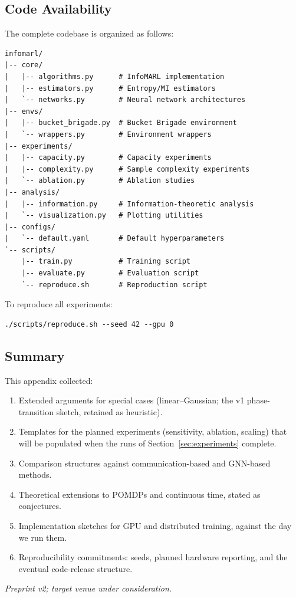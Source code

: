 \documentclass[10pt, letterpaper]{article}
\begin{document}
\subsection{Code Availability}

The complete codebase is organized as follows:

\begin{verbatim}
infomarl/
|-- core/
|   |-- algorithms.py      # InfoMARL implementation
|   |-- estimators.py      # Entropy/MI estimators
|   `-- networks.py        # Neural network architectures
|-- envs/
|   |-- bucket_brigade.py  # Bucket Brigade environment
|   `-- wrappers.py        # Environment wrappers
|-- experiments/
|   |-- capacity.py        # Capacity experiments
|   |-- complexity.py      # Sample complexity experiments
|   `-- ablation.py        # Ablation studies
|-- analysis/
|   |-- information.py     # Information-theoretic analysis
|   `-- visualization.py   # Plotting utilities
|-- configs/
|   `-- default.yaml       # Default hyperparameters
`-- scripts/
    |-- train.py           # Training script
    |-- evaluate.py        # Evaluation script
    `-- reproduce.sh       # Reproduction script
\end{verbatim}

To reproduce all experiments:

\begin{verbatim}
./scripts/reproduce.sh --seed 42 --gpu 0
\end{verbatim}

\subsection{Summary}

This appendix collected:
\begin{enumerate}
    \item Extended arguments for special cases (linear--Gaussian; the v1 phase-transition sketch, retained as heuristic).
    \item Templates for the planned experiments (sensitivity, ablation, scaling) that will be populated when the runs of Section~\ref{sec:experiments} complete.
    \item Comparison structures against communication-based and GNN-based methods.
    \item Theoretical extensions to POMDPs and continuous time, stated as conjectures.
    \item Implementation sketches for GPU and distributed training, against the day we run them.
    \item Reproducibility commitments: seeds, planned hardware reporting, and the eventual code-release structure.
\end{enumerate}

\bigskip

\noindent\emph{Preprint v2; target venue under consideration.}
\end{document}
